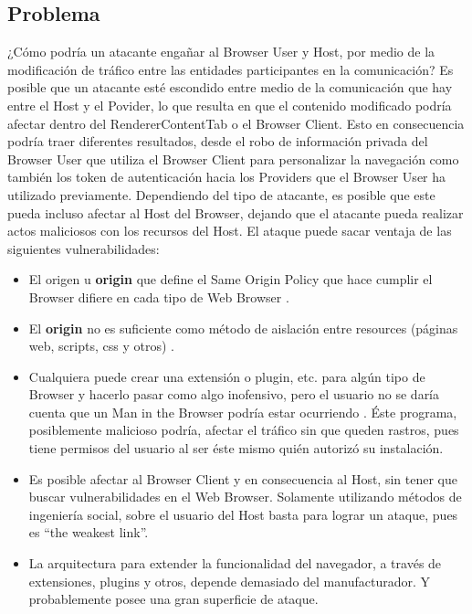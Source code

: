 \subsection{Problema}
¿Cómo podría un atacante engañar al Browser User y Host, por medio de la modificación de tráfico entre las entidades participantes en la comunicación? Es posible que un atacante esté escondido entre medio de la comunicación que hay entre el Host y el Povider, lo que resulta en que el contenido modificado podría afectar dentro del RendererContentTab o el Browser Client. Esto en consecuencia podría traer diferentes resultados, desde el robo de información privada del Browser User que utiliza el Browser Client para personalizar la navegación como también los token de autenticación hacia los Providers que el Browser User ha utilizado previamente. Dependiendo del tipo de atacante, es posible que este pueda incluso afectar al Host del Browser, dejando que el atacante pueda realizar actos maliciosos con los recursos del Host. 
El ataque puede sacar ventaja de las siguientes vulnerabilidades:
\begin{itemize}
	\item El origen u \textbf{origin} que define el Same Origin Policy que hace cumplir el Browser difiere en cada tipo de Web Browser \cite{W3C-SOP,Reis2009, Jackson2008, Crowley2010, Paola2006}.
	\item El \textbf{origin} no es suficiente como método de aislación entre resources (páginas web, scripts, css y otros) \cite{Silic2010, Barth2009, Yason, Liu2012}.
	\item Cualquiera puede crear una extensión o plugin, etc. para algún tipo de Browser y hacerlo pasar como algo inofensivo, pero el usuario no se daría cuenta que un Man in the Browser podría estar ocurriendo \cite{Dougan2012,Utakrit2009,Liu2012,Barth2010}.  Éste programa, posiblemente malicioso podría, afectar el tráfico sin que queden rastros, pues tiene permisos del usuario al ser éste mismo quién autorizó su instalación.
	\item Es posible afectar al Browser Client y en consecuencia al Host, sin tener que buscar vulnerabilidades en el Web Browser. Solamente utilizando métodos de ingeniería social, sobre el usuario del Host basta para lograr un ataque, pues es “the weakest link”.
	\item La arquitectura para extender la funcionalidad del navegador, a través de extensiones, plugins y otros, depende demasiado del manufacturador. Y probablemente posee una gran superficie de ataque.
\end{itemize}

